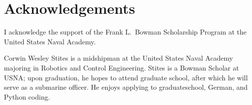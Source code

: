 \documentclass[twocolumn,10pt]{IEEEtran}
\newcommand{\myroot}{.}
\begin{document}
\section*{Acknowledgements}
I acknowledge the support of the Frank L.~Bowman Scholarship Program at the United States Naval Academy. 



\begin{IEEEbiography}{Corwin Wesley Stites} is a midshipman at the United States Naval Academy majoring in Robotics and Control Engineering. Stites is a Bowman Scholar at USNA; upon graduation, he hopes to attend graduate school, after which he will serve as a submarine officer. He enjoys applying to graduateschool, German, and Python coding. 
\end{IEEEbiography}
\end{document}

